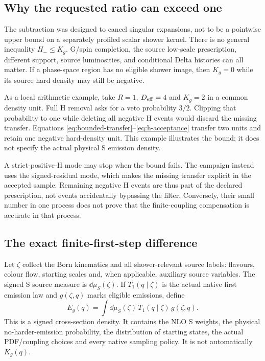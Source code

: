 \subsection{Why the requested ratio can exceed one}
The subtraction was designed to cancel singular expansions, not to be a
pointwise upper bound on a separately profiled scalar shower kernel.
There is no general inequality $H_-\leq K_g$. G/spin completion, the
source low-scale prescription, different support, source luminosities,
and conditional Delta histories can all matter. If a phase-space region
has no eligible shower image, then $K_g=0$ while its source hard density
may still be negative.

As a local arithmetic example, take $R=1$, $D_{\rm eff}=4$ and $K_g=2$
in a common density unit. Full H removal asks for a veto probability
$3/2$. Clipping that probability to one while deleting all negative H
events would discard the missing transfer. Equations
\eqref{eq:bounded-transfer}--\eqref{eq:h-acceptance} transfer two units
and retain one negative hard-density unit. This example illustrates the
bound; it does not specify the actual physical S emission density.

A strict-positive-H mode may stop when the bound fails. The campaign
instead uses the signed-residual mode, which makes the missing transfer
explicit in the accepted sample. Remaining negative H events are thus
part of the declared prescription, not events accidentally bypassing the
filter. Conversely, their small number in one process does not prove
that the finite-coupling compensation is accurate in that process.

\subsection{The exact finite-first-step difference}
\label{sec:finite-difference}
Let $\zeta$ collect the Born kinematics and all shower-relevant source
labels: flavours, colour flow, starting scales and, when applicable,
auxiliary source variables. The signed S source measure is
$\dd\mu_S(\zeta)$. If $T_1(q\mid\zeta)$ is the actual native first
emission law and $g(\zeta,q)$ marks eligible emissions, define
\begin{equation}
 E_g(q)=\int\dd\mu_S(\zeta)\,
                  T_1(q\mid\zeta)\,g(\zeta,q).
 \label{eq:actual-s-density}
\end{equation}
This is a signed cross-section density. It contains the NLO S weights,
the physical no-harder-emission probability, the distribution of starting
states, the actual PDF/coupling choices and every native sampling policy.
It is not automatically $K_g(q)$.

